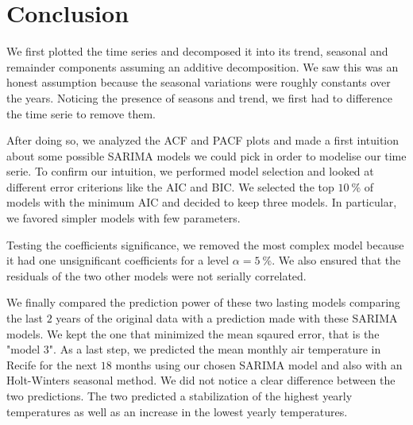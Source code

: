 \section{Conclusion}

We first plotted the time series and decomposed it into its trend, seasonal and remainder components assuming an additive decomposition. We saw this was an honest assumption because the seasonal variations were roughly constants over the years. Noticing the presence of seasons and trend, we first had to difference the time serie to remove them.

After doing so, we analyzed the ACF and PACF plots and made a first intuition about some possible SARIMA models we could pick in order to modelise our time serie. To confirm our intuition, we performed model selection and looked at different error criterions like the AIC and BIC. We selected the top $\SI{10}{\percent}$ of models with the minimum AIC and decided to keep three models. In particular, we favored simpler models with few parameters.

Testing the coefficients significance, we removed the most complex model because it had one unsignificant coefficients for a level $\alpha = \SI{5}{\percent}$. We also ensured that the residuals of the two other models were not serially correlated.

We finally compared the prediction power of these two lasting models comparing the last $2$ years of the original data with a prediction made with these SARIMA models. We kept the one that minimized the mean sqaured error, that is the "model 3". As a last step, we predicted the mean monthly air temperature in Recife for the next $18$ months using our chosen SARIMA model and also with an Holt-Winters seasonal method. We did not notice a clear difference between the two predictions. The two predicted a stabilization of the highest yearly temperatures as well as an increase in the lowest yearly temperatures.